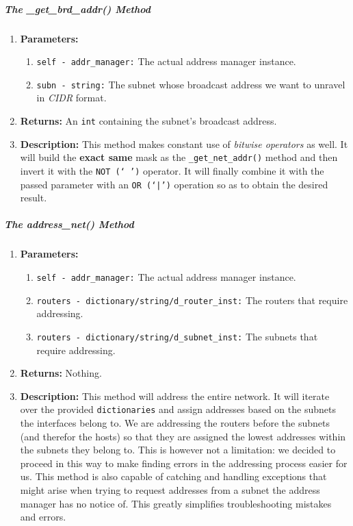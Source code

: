         \subparagraph{The \_get\_brd\_addr() Method}
            \begin{enumerate}
                \item \textbf{Parameters:}
                \begin{enumerate}
                    \item \texttt{self - addr\_manager:} The actual address manager instance.
                    \item \texttt{subn - string:} The subnet whose broadcast address we want to unravel in \textit{CIDR} format.
                \end{enumerate}
                \item \textbf{Returns:} An \texttt{int} containing the subnet's broadcast address.
                \item \textbf{Description:} This method makes constant use of \textit{bitwise operators} as well. It will build the \textbf{exact same} mask as the \texttt{\_get\_net\_addr()} method and then invert it with the \texttt{NOT (`~')} operator. It will finally combine it with the passed parameter with an \texttt{OR (`|')} operation so as to obtain the desired result.
            \end{enumerate}

        \subparagraph{The address\_net() Method}
            \begin{enumerate}
                \item \textbf{Parameters:}
                \begin{enumerate}
                    \item \texttt{self - addr\_manager:} The actual address manager instance.
                    \item \texttt{routers - dictionary/string/d\_router\_inst:} The routers that require addressing.
                    \item \texttt{routers - dictionary/string/d\_subnet\_inst:} The subnets that require addressing.
                \end{enumerate}
                \item \textbf{Returns:} Nothing.
                \item \textbf{Description:} This method will address the entire network. It will iterate over the provided \texttt{dictionaries} and assign addresses based on the subnets the interfaces belong to. We are addressing the routers before the subnets (and therefor the hosts) so that they are assigned the lowest addresses within the subnets they belong to. This is however not a limitation: we decided to proceed in this way to make finding errors in the addressing process easier for us. This method is also capable of catching and handling exceptions that might arise when trying to request addresses from a subnet the address manager has no notice of. This greatly simplifies troubleshooting mistakes and errors.
            \end{enumerate}

